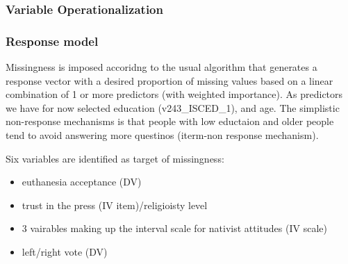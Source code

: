 \subsubsection{Variable Operationalization}

\subsubsection{Response model}
Missingness is imposed accoridng to the usual algorithm that generates a response vector
with a desired proportion of missing values based on a linear combination of 1 or more
predictors (with weighted importance). As predictors we have for now selected education (v243\_ISCED\_1),
and age. The simplistic non-response mechanisms is that people with low eductaion and older people tend 
to avoid answering more questinos (iterm-non response mechanism). 

Six variables are identified as target of missingness: 
\begin{itemize}
	\item euthanesia acceptance (DV)
	\item trust in the press (IV item)/religioisty level
	\item 3 vairables making up the interval scale for nativist attitudes (IV scale)
	\item left/right vote (DV)
\end{itemize}


